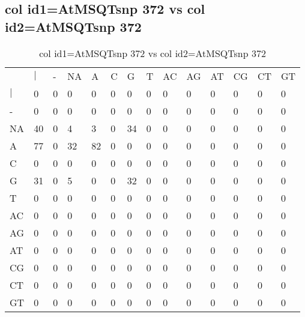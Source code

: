 \subsection{col id1=AtMSQTsnp 372 vs col id2=AtMSQTsnp 372}
\begin{center}
\begin{longtable}{|l|l|l|l|l|l|l|l|l|l|l|l|l|l|}
\caption{col id1=AtMSQTsnp 372 vs col id2=AtMSQTsnp 372} \label{table_dm884}\\
\hline
\\
\hline
&$|$&-&NA&A&C&G&T&AC&AG&AT&CG&CT&GT\\
$|$&0&0&0&0&0&0&0&0&0&0&0&0&0\\
-&0&0&0&0&0&0&0&0&0&0&0&0&0\\
NA&40&0&4&3&0&34&0&0&0&0&0&0&0\\
A&77&0&32&82&0&0&0&0&0&0&0&0&0\\
C&0&0&0&0&0&0&0&0&0&0&0&0&0\\
G&31&0&5&0&0&32&0&0&0&0&0&0&0\\
T&0&0&0&0&0&0&0&0&0&0&0&0&0\\
AC&0&0&0&0&0&0&0&0&0&0&0&0&0\\
AG&0&0&0&0&0&0&0&0&0&0&0&0&0\\
AT&0&0&0&0&0&0&0&0&0&0&0&0&0\\
CG&0&0&0&0&0&0&0&0&0&0&0&0&0\\
CT&0&0&0&0&0&0&0&0&0&0&0&0&0\\
GT&0&0&0&0&0&0&0&0&0&0&0&0&0\\
\hline
\end{longtable}
\end{center}

